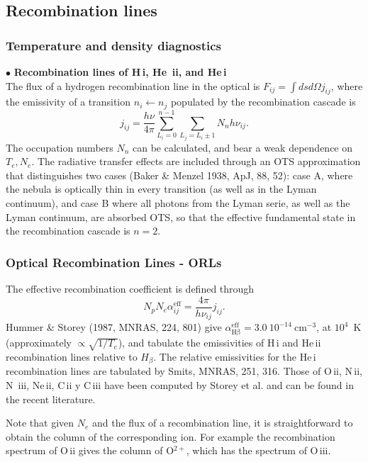 \subsection{Recombination lines}
\begin{frame}\frametitle{Temperature
and density diagnostics}


{$\bullet$ \bf Recombination lines of  H\,{\sc i}, He\,{\sc
ii}, and He\,{\sc i} } \\

The flux of a hydrogen recombination line in the optical is $F_{ij} =
\int ds d\Omega j_{ij}$, where the emissivity of a transition  $n_i
\leftarrow n_j$ populated by the recombination cascade is 
\[ 
j_{ij} = \frac{h \nu}{4 \pi} \sum_{L_i=0}^{n-1} \sum_{L_j=L_i\pm1} N_n
h\nu_{ij}.
\]
The occupation numbers $N_n$ can be calculated, and bear a weak
dependence on ${T_e,N_e}$. The radiative transfer effects are included
through an OTS approximation that distinguishes two cases (Baker \&
Menzel 1938, ApJ, 88, 52): case A, where the nebula is optically thin
in every transition (as well as in the Lyman continuum), and case B
where all photons from the Lyman serie, as well as the Lyman
continuum, are absorbed OTS, so that the effective fundamental state
in the recombination cascade is $n=2$.

\end{frame}
\begin{frame}\frametitle{Optical Recombination Lines - ORLs}




The effective recombination coefficient is defined through 
\[
N_p N_e \alpha_{ij}^\mathrm{eff} = \frac{4 \pi}{h \nu_{ij}}  j_{ij}.
\]
Hummer \& Storey (1987, MNRAS, 224, 801) give 
$\alpha_\mathrm{H\beta}^\mathrm{eff} =3.0~10^{-14}~$cm$^{-3}$, at
$10^4$~K (approximately  $\propto
\sqrt{1/T_e}$), and tabulate the emissivities of H\,{\sc i} and
He\,{\sc ii} recombination lines relative to $H_\beta$. The relative
emissivities for the He\,{\sc i} recombination lines are tabulated by
Smits, MNRAS, 251, 316. Those of O\,{\sc ii}, N\,{\sc ii}, N\,{\sc
iii}, Ne\,{\sc ii}, C\,{\sc ii} y C\,{\sc iii} have been computed by
Storey et al. and can be found in the recent literature.

Note that given $N_e$ and the flux of a recombination line, it is
straightforward to obtain the column of the corresponding ion. For
example the recombination spectrum of O\,{\sc ii} gives the column of
O$^{2+}$, which has the spectrum of O\,{\sc iii}.

\end{frame}
